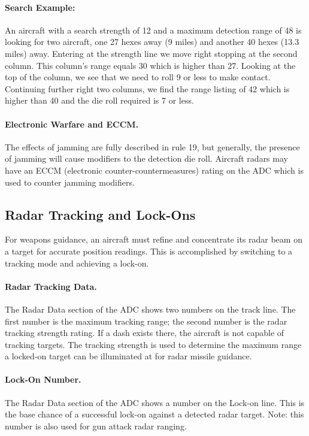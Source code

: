 \paragraph{Search Example:} An aircraft with a search strength of 12 and a maximum detection range of 48 is looking for two aircraft, one 27 hexes away (9 miles) and another 40 hexes (13.3 miles) away. Entering at the strength line we move right stopping at the second column. This column's range equals 30 which is higher than 27. Looking at the top of the column, we see that we need to roll 9 or less to make contact. Continuing further right two columns, we find the range listing of 42 which is higher than 40 and the die roll required is 7 or less.

\paragraph{Electronic Warfare and ECCM.} The effects of jamming are fully described in rule 19, but generally, the presence of jamming will cause modifiers to the detection die roll. Aircraft radars may have an ECCM (electronic counter-countermeasures) rating on the ADC which is used to counter jamming modifiers.

\subsection{Radar Tracking and Lock-Ons}

For weapons guidance, an aircraft must refine and concentrate its radar beam on a target for accurate position readings. This is accomplished by switching to a tracking mode and achieving a lock-on.

\paragraph{Radar Tracking Data.} The Radar Data section of the ADC shows two numbers on the track line. The first number is the maximum tracking range; the second number is the radar tracking strength rating. If a dash exists there, the aircraft is not capable of tracking targets. The tracking strength is used to determine the maximum range a locked-on target can be illuminated at for radar missile guidance.

\paragraph{Lock-On Number.} The Radar Data section of the ADC shows a number on the Lock-on line. This is the base chance of a successful lock-on against a detected radar target. Note: this number is also used for gun attack radar ranging.


